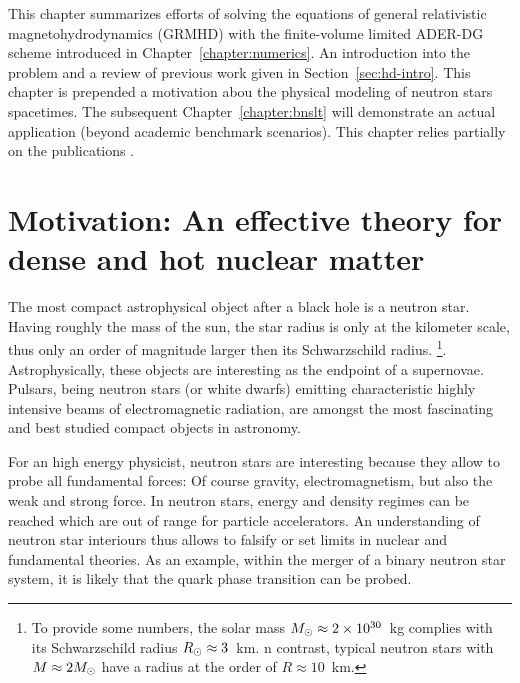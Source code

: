 \newcommand{\desc}[1]{\text{#1}\quad} %
\newcommand{\hydro}{\text{HD}}
\newcommand{\mhd}{\text{MHD}}
\newcommand{\adm}{\text{ADM}}
\newcommand{\hd}{\text{HD}}
\newcommand{\srhd}{\text{SRHD}}
\newcommand{\grhd}{\text{GRHD}}
\newcommand{\grmhd}{\text{GRMHD}}
\newcommand{\bmag}{\text{B}}
\newcommand{\magneto}{\text{MD}} %

\newenvironment{pvector}{\begin{pmatrix*}[l]}{\end{pmatrix*}}

This chapter summarizes efforts of solving the equations of general relativistic
magnetohydrodynamics (GRMHD) with the finite-volume limited ADER-DG scheme
introduced in Chapter~\vref{chapter:numerics}. 
An introduction into the problem and a review of previous work given in
Section~\vref{sec:hd-intro}. This chapter is prepended a motivation abou
the physical modeling of neutron stars spacetimes.
The subsequent Chapter~\vref{chapter:bnslt}
will demonstrate an actual application (beyond academic benchmark scenarios).
This chapter relies partially on the publications \cite{Fambri2018,Koeppel2017}.

\section[
  Motivation: An effective theory for dense and hot matter
]{Motivation: An effective theory for dense and hot nuclear 
matter}\label{sec:hd-nuclear-matter}
The most compact astrophysical object after a black hole is a neutron star.
Having roughly the mass of the sun, the star radius is only at the kilometer
scale, thus only an order of magnitude larger then its Schwarzschild radius.
\footnote{To provide some numbers, the solar mass $M_{\odot} \approx 2 \times 
10^{30}$~kg complies with its Schwarzschild radius $R_\odot \approx 3$~km.
n contrast, typical neutron stars with $M \approx 2 M_{\odot}$
have a radius at the order of $R\approx 10$~km.}. 
Astrophysically, these objects are interesting as the endpoint of a supernovae.
Pulsars, being neutron stars (or white dwarfs) emitting characteristic
highly intensive beams of electromagnetic radiation, are amongst the most
fascinating and best studied compact objects in astronomy.

For an high energy physicist, neutron stars are interesting because they allow 
to probe all fundamental forces: Of course gravity, electromagnetism, but also
the weak and strong force. In
neutron stars, energy and density regimes can be reached which are out of
range for particle accelerators. An understanding of neutron star interiours
thus allows to falsify or set limits in nuclear and fundamental theories.
As an example, within the merger of a binary neutron star system, it is likely
that the quark phase transition can be probed.

